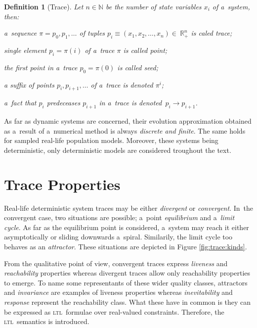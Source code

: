 \documentclass[12pt,twoside,draft]{fithesis}
\newcommand{\ltl}{\textsc{ltl}~}
\newcommand{\mReal}{\mathbb{R}}
\newcommand{\mNatural}{\mathbb{N}}
\newtheorem{mydef}{Definition}
\begin{document}
\begin{mydef}[Trace]
Let $n\in\mNatural$ be the number of state variables $x_i$ of a~system,
then:
\begin{inparaenum}
\item a~sequence $\pi=p_0,p_1,\dotsc$ of tuples
$p_i\equiv(x_1,x_2,\dotsc,x_n)\in~\mReal_{+}^n$ is caled trace;
\item single element $p_i=\pi(i)$ of a~trace $\pi$ is called point;
\item the first point in a~trace $p_0=\pi(0)$ is called seed;
\item a suffix of points $p_i,p_{i+1},\dotsc$ of a~trace is
denoted $\pi^i$;
\item a~fact that $p_i$ predeceases $p_{i+1}$ in a~trace is
denoted~$p_i\rightarrow p_{i+1}$.
\end{inparaenum}
\end{mydef}

As far as dynamic systems are concerned, their evolution approximation
obtained as a~result of a~numerical method is always \emph{discrete and
finite}. The same holds for sampled real-life population models.
Moreover, these systems being deterministic\cite{sven}, only
deterministic models are considered troughout the text.

\section{Trace Properties}
Real-life deterministic system traces may be either \emph{divergent} or
\emph{convergent}. In~the convergent case, two situations are possible;
a~point \emph{equilibrium} and a~\emph{limit cycle}. As far as the
equilibrium point is considered, a~system may reach it either
asymptotically or sliding downwards a~spiral. Similarily, the limit
cycle too behaves as an \emph{attractor}. These situations are depicted
in Figure \ref{fig:trace:kinds}.

From the qualitative point of view, convergent traces express
\emph{liveness} and \emph{reachability} properties whereas
divergent traces allow only reachability properties to emerge.
To name some representants of these wider quality classes,
attractors and  \emph{invariance} are examples of liveness
properties whereas \emph{inevitability} and \emph{response} represent
the reachability class\cite{rizk}. What these have in common is they
can be expressed as \ltl formulae over real-valued
constraints\cite{sven}. Therefore, the \ltl semantics is introduced.
\end{document}
